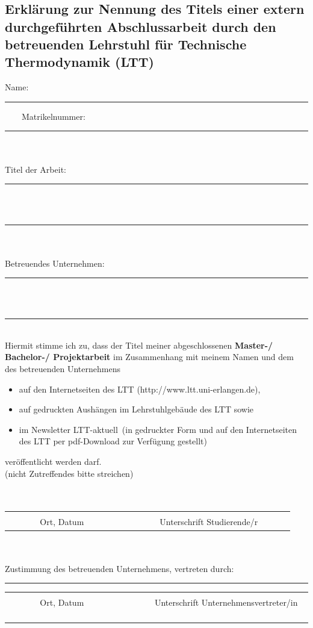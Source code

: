 \chapter*{}
\section*{Erklärung zur Nennung des Titels einer extern durchgeführten Abschlussarbeit durch den betreuenden Lehrstuhl für Technische Thermodynamik (LTT)}\label{chapter:Erklaerung_Veroeffentlichung}


Name:\rule{0.45\textwidth}{0.4pt} $\qquad$Matrikelnummer:\rule{0.25\textwidth}{0.4pt}  \\
\\
Titel der Arbeit:\rule{0.825\textwidth}{0.4pt} \\
\\
\rule{\textwidth}{0.4pt} \\
\\
Betreuendes Unternehmen: \rule{0.715\textwidth}{0.4pt} \\
\\
\rule{\textwidth}{0.4pt} \\

Hiermit stimme ich zu, dass der Titel meiner abgeschlossenen \textbf{Master-/ Bachelor-/ Projektarbeit }im Zusammenhang mit meinem Namen und dem des betreuenden Unternehmens
\begin{itemize}
 \item auf den Internetseiten des LTT (http://www.ltt.uni-erlangen.de),
 \item auf gedruckten Aushängen im Lehrstuhlgebäude des LTT sowie
 \item im Newsletter \glqq LTT-aktuell\grqq \, (in gedruckter Form und auf den Internetseiten des LTT per pdf-Download zur Verfügung gestellt) 
\end{itemize}
veröffentlicht werden darf.\\
(nicht Zutreffendes bitte streichen) \newline
\\
\\
\\

\begin{tabularx}{\textwidth}{lXc}
   &     &  \\ \hhline{-~-}
 $\quad$ $\qquad$ Ort, Datum $\qquad$$\quad$	 &     &$\quad$ $\qquad$ Unterschrift Studierende/r $\qquad$$\quad$
\end{tabularx} 	  						
 \\
 \newline
 \\
Zustimmung des betreuenden Unternehmens, vertreten durch: \rule{0.35\textwidth}{0.4pt}
 \newline
  \newline
\begin{tabularx}{\textwidth}{lXc}
   &     &  \\ \hhline{-~-}
 $\quad$ $\qquad$ Ort, Datum $\qquad$$\quad$	 &     &$\quad$ $\qquad$ Unterschrift Unternehmensvertreter/in $\qquad$$\quad$
\end{tabularx} 	